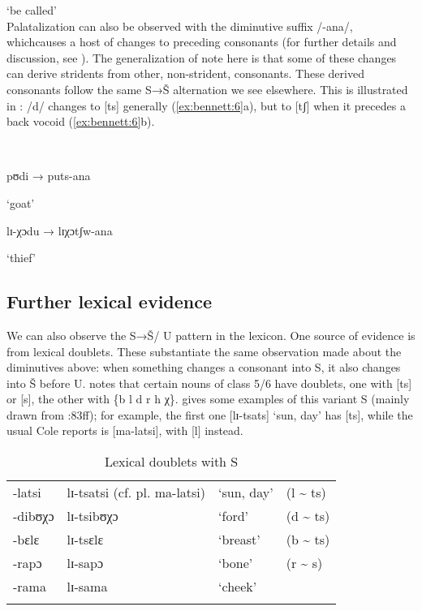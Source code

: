      ‘be called’\\
\z
\z
Palatalization can also be observed with the diminutive suffix /-ana/, which\linebreak causes a host of changes to preceding consonants (for further details and discussion, see \citealt{Cole1955,Louw1975,Herbert1990,Bateman:2007aa,Kotze&Zerbian2008}). The generalization of note here is that some of these changes can derive stridents from other, non-strident, consonants. These derived consonants follow the same S→Š alternation we see elsewhere. This is illustrated in : /d/ changes to [ts] generally (\ref{ex:bennett:6}a), but to [tʃ] when it precedes a back vocoid (\ref{ex:bennett:6}b). 

\ea\label{ex:bennett:6}
\\
\ea\label{ex:bennett:6a}

pʊdi  → puts-ana

     ‘goat’\\
\ex\label{ex:bennett:6b}

lɪ-χɔdu  → lɪχɔtʃw-ana

     ‘thief’\\
\z
\z

\subsection{Further lexical evidence}\label{sec:bennett:2.5}


We can also observe the S→Š/ {\longrule} U pattern in the lexicon. One source of evidence is from lexical doublets. These substantiate the same observation made about the diminutives above: when something changes a consonant into S, it also changes into Š before U. \citet[83ff]{Cole1955} notes that certain nouns of class 5/6 have doublets, one with [ts] or [s], the other with \{b l d r h χ\}.  gives some examples of this variant S (mainly drawn from \citealt{Cole1955}:83ff); for example, the first one [lɪ-tsats] ‘sun, day’ has [ts], while the usual  Cole reports is [ma-latsi], with [l] instead.

\begin{table}
\begin{tabularx}{\textwidth}{llXX}
\lsptoprule

-latsi & lɪ-tsatsi (cf. pl. ma-latsi) & ‘sun, day’ & (l {\textasciitilde} ts)\\
-dibʊχɔ & lɪ-tsibʊχɔ & ‘ford’ & (d {\textasciitilde} ts)\\
-bɛlɛ & lɪ-tsɛlɛ & ‘breast’ & (b {\textasciitilde} ts)\\
-rapɔ & lɪ-sapɔ & ‘bone’ & (r {\textasciitilde} s) \\
-rama & lɪ-sama & ‘cheek’ & \\
\lspbottomrule
\end{tabularx}
\caption{Lexical doublets with S}
\label{tab:bennett:4}
\end{table}

